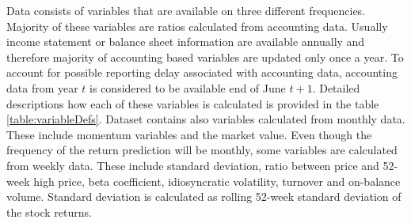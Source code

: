\documentclass{article}
\begin{document}
Data consists of variables that are available on three different frequencies. Majority of these variables are ratios calculated from accounting data. 
Usually income statement or balance sheet information are available annually and therefore majority of accounting based variables are updated only once a year. To account for possible reporting delay associated with accounting data, accounting data from year $t$ is considered to be available end of June $t+1$. Detailed descriptions how each of these variables is calculated is provided in the table \ref{table:variableDefs}. Dataset contains also variables calculated from monthly data. These include momentum variables and the market value. Even though the frequency of the return prediction will be monthly, some variables are calculated from weekly data. These include standard deviation, ratio between price and 52-week high price, beta coefficient, idiosyncratic volatility, turnover and on-balance volume. Standard deviation is calculated as rolling 52-week standard deviation of the stock returns. \par
\end{document}
